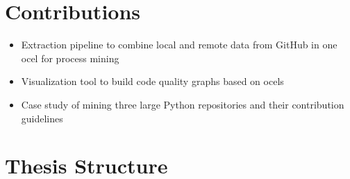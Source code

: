 \section{Contributions}
\label{sec:intro_ssec:c}
\begin{itemize}
	\item Extraction pipeline to combine local and remote data from GitHub in one \ac{ocel} for process mining
	\item Visualization tool to build code quality graphs based on \acp{ocel}
	\item Case study of mining three large Python repositories and their contribution guidelines
\end{itemize}


\section{Thesis Structure}
\label{sec:intro_ssec:ts}